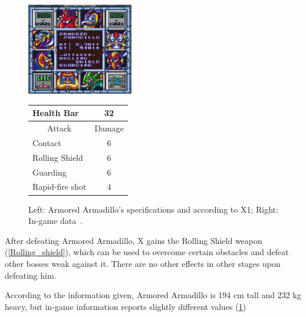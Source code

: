 \begin{figure}[htp]
	\begin{minipage}[c]{0.45\linewidth}
		\vspace{0pt}
		\centering
		\includegraphics[height=4cm]{figures/X1/Armored_armadillo/Armored_armadillo_specs.png}
	\end{minipage}
	\begin{minipage}[c]{0.45\linewidth}
		\centering
		\vspace{0pt}
		\begin{tabular}[h]{l c}
			\toprule
			Health Bar & 32\\
			\midrule
			\multicolumn{1}{c}{Attack} & \multicolumn{1}{c}{Damage}\\
			Contact & 6\\
			Rolling Shield& 6\\
			Guarding & 6\\
			Rapid-fire shot & 4\\
			\bottomrule
		\end{tabular}
	\end{minipage}
	\caption{Left: Armored Armadillo's specifications and according to X1; Right: In-game data~\cite{wiki:Armored_Armadillo}. }
	\label{Armadillo_specs}
\end{figure}
After defeating Armored Armadillo, X gains the Rolling Shield weapon (\ref{Rolling_shield}), which can be used to overcome certain obstacles and defeat other bosses weak against it. There are no other effects in other stages upon defeating him.

According to the information given, Armored Armadillo is 194 cm tall and 232 kg heavy, but in-game information reports slightly different values (\ref{Armadillo_specs})


